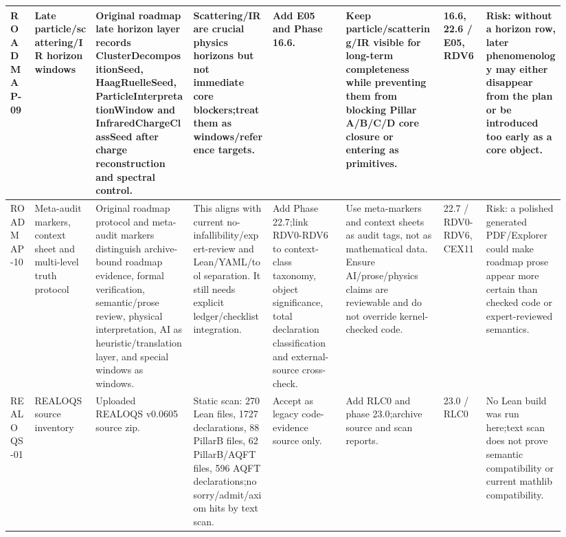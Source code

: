 \begin{longtable}{L{0.04\linewidth} L{0.105\linewidth} L{0.16\linewidth} L{0.13\linewidth} L{0.125\linewidth} L{0.165\linewidth} L{0.075\linewidth} L{0.135\linewidth}}
ROADMAP-09 & Late particle/\allowbreak{}scattering/\allowbreak{}IR horizon windows & Original roadmap late horizon layer records ClusterDecompositionSeed, HaagRuelleSeed, ParticleInterpretationWindow and InfraredChargeClassSeed after charge reconstruction and spectral control. & Scattering/\allowbreak{}IR are crucial physics horizons but not immediate core blockers;\newline treat them as windows/\allowbreak{}reference targets. & Add E05 and Phase 16.6. & Keep particle/\allowbreak{}scattering/\allowbreak{}IR visible for long-term completeness while preventing them from blocking Pillar A/\allowbreak{}B/\allowbreak{}C/\allowbreak{}D core closure or entering as primitives. & 16.6, 22.6 /\allowbreak{} E05, RDV6 & Risk: without a horizon row, later phenomenology may either disappear from the plan or be introduced too early as a core object.\\
\hline
\addlinespace[0.24em]
ROADMAP-10 & Meta-audit markers, context sheet and multi-level truth protocol & Original roadmap protocol and meta-audit markers distinguish archive-bound roadmap evidence, formal verification, semantic/\allowbreak{}prose review, physical interpretation, AI as heuristic/\allowbreak{}translation layer, and special windows as windows. & This aligns with current no-infallibility/\allowbreak{}expert-review and Lean/\allowbreak{}YAML/\allowbreak{}tool separation. It still needs explicit ledger/\allowbreak{}checklist integration. & Add Phase 22.7;\newline link RDV0-RDV6 to context-class taxonomy, object significance, total declaration classification and external-source cross-check. & Use meta-markers and context sheets as audit tags, not as mathematical data. Ensure AI/\allowbreak{}prose/\allowbreak{}physics claims are reviewable and do not override kernel-checked code. & 22.7 /\allowbreak{} RDV0-RDV6, CEX11 & Risk: a polished generated PDF/\allowbreak{}Explorer could make roadmap prose appear more certain than checked code or expert-reviewed semantics.\\
\hline
\addlinespace[0.24em]
REALOQS-01 & REALOQS source inventory & Uploaded REALOQS v0.0605 source zip. & Static scan: 270 Lean files, 1727 declarations, 88 PillarB files, 62 PillarB/\allowbreak{}AQFT files, 596 AQFT declarations;\newline no sorry/\allowbreak{}admit/\allowbreak{}axiom hits by text scan. & Accept as legacy code-evidence source only. & Add RLC0 and phase 23.0;\newline archive source and scan reports. & 23.0 /\allowbreak{} RLC0 & No Lean build was run here;\newline text scan does not prove semantic compatibility or current mathlib compatibility.\\

\end{longtable}
